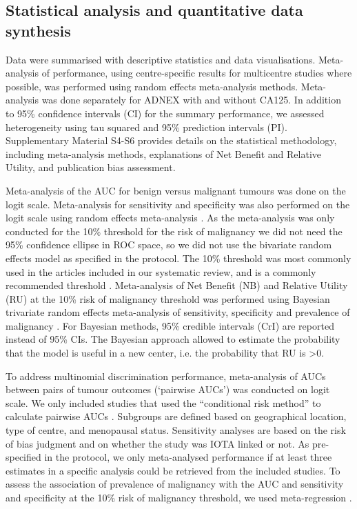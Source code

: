 \subsection{Statistical analysis and quantitative data synthesis}
Data were summarised with descriptive statistics and data visualisations.
Meta-analysis of performance, using centre-specific results for multicentre
studies where possible, was performed using random effects meta-analysis
methods. Meta-analysis was done separately for \gls{ADNEX} with and without CA125. In
addition to 95\% confidence intervals (\gls{CI}) for the summary performance, we
assessed heterogeneity using tau squared and 95\% prediction intervals (\gls{PI}).
Supplementary Material S4-S6 provides details on the statistical methodology,
including meta-analysis methods, explanations of Net Benefit and Relative
Utility, and publication bias assessment.

Meta-analysis of the \gls{AUC} for benign versus malignant tumours was done on the
logit scale. Meta-analysis for sensitivity and specificity was also performed on
the logit scale using random effects meta-analysis
 \cite{rileyBivariateRandomeffectsMetaanalysis2007}. As the meta-analysis was
only conducted for the 10\% threshold for the risk of malignancy we did not need
the 95\% confidence ellipse in \gls{ROC} space, so we did not use the bivariate random
effects model as specified in the protocol. The 10\% threshold was most commonly
used in the articles included in our systematic review, and is a commonly
recommended threshold \cite{timmermanESGOISUOGIOTA2021}. Meta-analysis of Net
Benefit (\gls{NB}) \cite{vickersDecisionCurveAnalysis2006} and Relative Utility (\gls{RU})
 \cite{bakerPuttingRiskPrediction2009} at the 10\% risk of malignancy threshold
was performed using Bayesian trivariate random effects meta-analysis of
sensitivity, specificity and prevalence of malignancy
 \cite{wynantsRandomeffectsMetaanalysisClinical2018}. For Bayesian methods, 95\%
credible intervals (\gls{CrI}) are reported instead of 95\% \glspl{CI}. The Bayesian approach
allowed to estimate the probability that the model is useful in a new center,
i.e. the probability that \gls{RU} is >0.

To address multinomial discrimination performance, meta-analysis of \glspl{AUC} between
pairs of tumour outcomes (‘pairwise \glspl{AUC}’) was conducted on logit scale. We only
included studies that used the “conditional risk method” to calculate pairwise
\glspl{AUC} \cite{vancalsterAssessingDiscriminativeAbility2012}. Subgroups are defined
based on geographical location, type of centre, and menopausal status.
Sensitivity analyses are based on the risk of bias judgment and on whether the
study was \gls{IOTA} linked or not. As pre-specified in the protocol, we only
meta-analysed performance if at least three estimates in a specific analysis
could be retrieved from the included studies. To assess the association of
prevalence of malignancy with the \gls{AUC} and sensitivity and specificity at the
10\% risk of malignancy threshold, we used meta-regression
 \cite{thompsonHowShouldMetaregression2002}.

